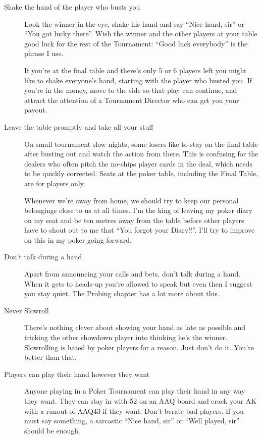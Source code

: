 \begin{description}

\item[Shake the hand of the player who busts you] Look the winner in the
eye, shake his hand and say ``Nice hand, sir'' or ``You got lucky there''.
Wish the winner and the other players at your table good luck for the
rest of the Tournament: ``Good luck everybody'' is the phrase I use.

If you're at the final table and there's only 5 or 6 players left you
might like to shake everyone's hand, starting with the player who
busted you. If you're in the money, move to the side so that play
can continue, and attract the attention of a Tournament Director who
can get you your payout.

\item[Leave the table promptly and take all your stuff] On small
tournament slow nights, some losers like to stay on the final table
after busting out and watch the action from there. This is confusing
for the dealers who often pitch the no-chips player cards in the deal,
which needs to be quickly corrected. Seats at the poker table,
including the Final Table, are for players only.

Whenever we're away from home, we should try to keep our personal
belongings close to us at all times. I'm the king of leaving my poker
diary on my seat and be ten metres away from the table before other
players have to shout out to me that ``You forgot your Diary!!''. I'll
try to improve on this in my poker going forward.

\item[Don't talk during a hand] Apart from announcing your calls and
bets, don't talk during a hand. When it gets to heads-up you're
allowed to speak but even then I suggest you stay quiet. The Probing
chapter has a lot more about this.

\item[Never Slowroll]  There's nothing clever about showing your hand
as late as possible and tricking the other showdown player into thinking
he's the winner. Slowrolling is hated by poker players for a
reason.
Just don't do it. You're better than that.


\item[Players can play their hand however they want] Anyone playing in
a Poker Tournament can play their hand in any way they want. They
can stay in with 52 on an AAQ board and crack your AK with a runout
of AAQ43 if they want. Don't berate bad players. If you must say
something, a sarcastic ``Nice hand, sir'' or ``Well played, sir'' should
be enough.


\end{description}
